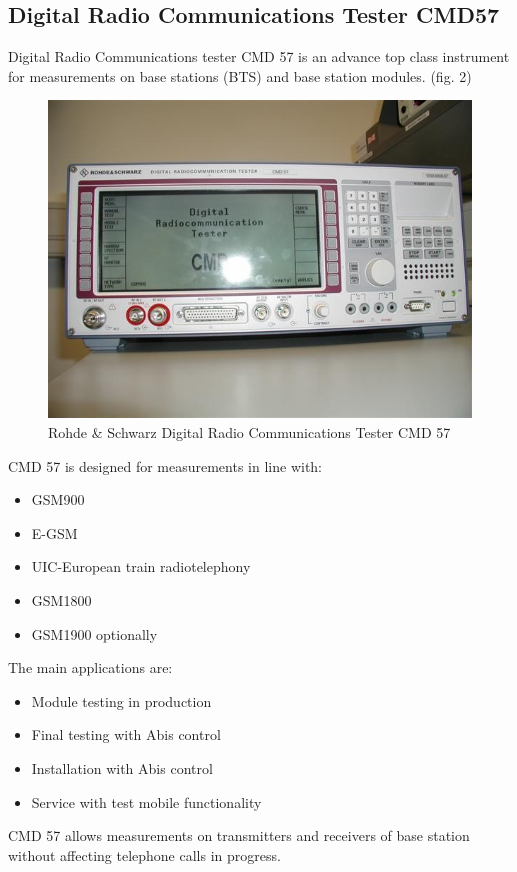 \documentclass[english]{article}
\begin{document}
\subsection{Digital Radio Communications Tester CMD57}
Digital Radio Communications tester CMD 57 is an advance top class instrument for measurements on base stations (BTS) and base station modules. (fig. 2)
\begin{figure}
\centerline{\includegraphics[scale=0.8]{GSM/Pic2}}
\caption{Rohde \& Schwarz Digital Radio Communications Tester CMD 57}
\end{figure}
CMD 57 is designed for measurements in line with:
\begin{itemize}
\item GSM900
\item E-GSM
\item UIC-European train radiotelephony
\item GSM1800
\item GSM1900 optionally
\end{itemize}
The main applications are:
\begin{itemize}
\item Module testing in production
\item Final testing with Abis control
\item Installation with Abis control
\item Service with test mobile functionality
\end{itemize}
CMD 57 allows measurements on transmitters and receivers of base station without affecting telephone calls in progress.
\end{document}
